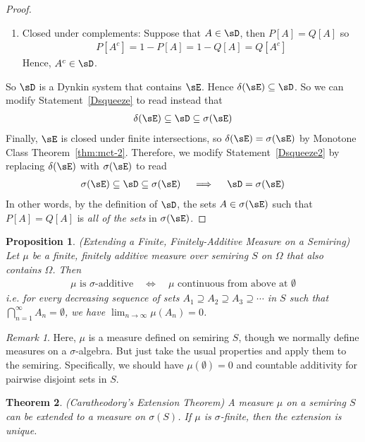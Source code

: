 \documentclass[12pt]{article}
\theoremstyle{plain}
\newtheorem{thm}{Theorem}[section]
\newtheorem{prop}[thm]{Proposition}
\theoremstyle{definition}
\theoremstyle{remark}
\newtheorem*{rmk}{Remark}
\newcommand{\ninf}{_{n=1}^\infty}
\newcommand{\limn}{\lim_{n\rightarrow\infty}}
\begin{document}
\begin{proof}
\begin{enumerate}
  \item Closed under complements: Suppose that $A\in \sD$, then
    $P[A]=Q[A]$ so
    \begin{align*}
      P[A^c] = 1 - P[A]
      = 1-Q[A] = Q[A^c]
    \end{align*}
    Hence, $A^c\in\sD$.
\end{enumerate}
So $\sD$ is a Dynkin system that contains $\sE$. Hence
$\delta(\sE)\subseteq\sD$. So we can modify Statement~\ref{Dsqueeze} to
read instead that
\begin{align}
  \delta(\sE) \subseteq \sD \subseteq \sigma(\sE)
  \label{Dsqueeze2}
\end{align}
Finally, $\sE$ is closed under finite intersections, so
$\delta(\sE)=\sigma(\sE)$ by Monotone Class Theorem~\ref{thm:mct-2}.
Therefore, we modify Statement~\ref{Dsqueeze2} by replacing
$\delta(\sE)$ with $\sigma(\sE)$ to read
\begin{align}
  \sigma(\sE) \subseteq \sD \subseteq \sigma(\sE)
  \quad\implies\quad
  \sD=\sigma(\sE)
  \label{Dsqueeze3}
\end{align}
In other words, by the definition of $\sD$, the sets $A\in \sigma(\sE)$
such that $P[A]=Q[A]$ is \emph{all of the sets} in $\sigma(\sE)$.
\end{proof}

\begin{prop}
\emph{(Extending a Finite, Finitely-Additive Measure on a Semiring)}
Let $\mu$ be a finite, finitely additive measure over semiring $S$ on
$\Omega$ that also contains $\Omega$. Then
\begin{align*}
  \text{$\mu$ is $\sigma$-additive}
  \quad\iff\quad
  \text{$\mu$ continuous from above at $\emptyset$}
\end{align*}
i.e.  for every decreasing sequence of sets
$A_1\supseteq A_2\supseteq A_3\supseteq \cdots$ in $S$ such that
$\bigcap\ninf A_n =\emptyset$, we have $\limn \mu(A_n)=0$.
\end{prop}
\begin{rmk}
Here, $\mu$ is a measure defined on semiring $S$, though we normally
define measures on a $\sigma$-algebra. But just take the usual
properties and apply them to the semiring. Specifically, we should have
$\mu(\emptyset)=0$ and countable additivity for pairwise disjoint sets
in $S$.
\end{rmk}

\begin{thm}\emph{(Caratheodory's Extension Theorem)}
\label{thm:cara}
A measure $\mu$ on a semiring $S$ can be extended to a measure on
$\sigma(S)$. If $\mu$ is $\sigma$-finite, then the extension is unique.
\end{thm}
\end{document}
